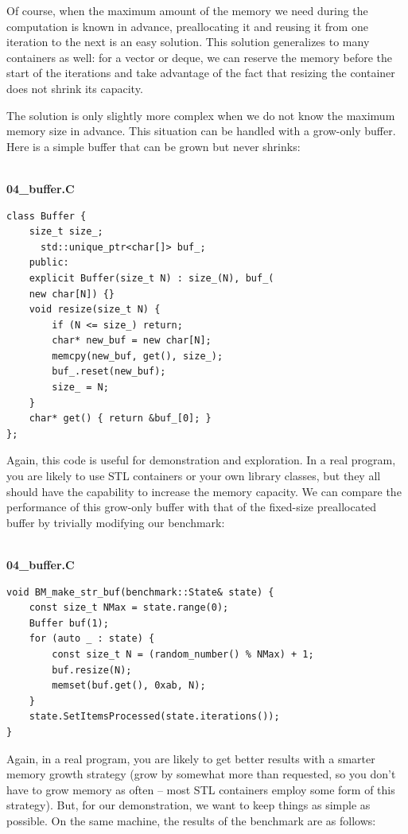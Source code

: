 Of course, when the maximum amount of the memory we need during the computation is known in advance, preallocating it and reusing it from one iteration to the next is an easy solution. This solution generalizes to many containers as well: for a vector or deque, we can reserve the memory before the start of the iterations and take advantage of the fact that resizing the container does not shrink its capacity.

The solution is only slightly more complex when we do not know the maximum memory size in advance. This situation can be handled with a grow-only buffer. Here is a simple buffer that can be grown but never shrinks:

\hspace*{\fill} \\ %
\noindent
\textbf{04\_buffer.C}
\begin{lstlisting}[style=styleCXX]
class Buffer {
	size_t size_;
	  std::unique_ptr<char[]> buf_;
	public:
	explicit Buffer(size_t N) : size_(N), buf_(
	new char[N]) {}
	void resize(size_t N) { 
		if (N <= size_) return;
		char* new_buf = new char[N];
		memcpy(new_buf, get(), size_);
		buf_.reset(new_buf);
		size_ = N;
	}
	char* get() { return &buf_[0]; }
};
\end{lstlisting}

Again, this code is useful for demonstration and exploration. In a real program, you are likely to use STL containers or your own library classes, but they all should have the capability to increase the memory capacity. We can compare the performance of this grow-only buffer with that of the fixed-size preallocated buffer by trivially modifying our benchmark:

\hspace*{\fill} \\ %
\noindent
\textbf{04\_buffer.C}
\begin{lstlisting}[style=styleCXX]
void BM_make_str_buf(benchmark::State& state) {
	const size_t NMax = state.range(0);
	Buffer buf(1);
	for (auto _ : state) {
		const size_t N = (random_number() % NMax) + 1;     
		buf.resize(N);
		memset(buf.get(), 0xab, N);
	}
	state.SetItemsProcessed(state.iterations());
}
\end{lstlisting}

Again, in a real program, you are likely to get better results with a smarter memory growth strategy (grow by somewhat more than requested, so you don’t have to grow memory as often – most STL containers employ some form of this strategy). But, for our demonstration, we want to keep things as simple as possible. On the same machine, the results of the benchmark are as follows:

